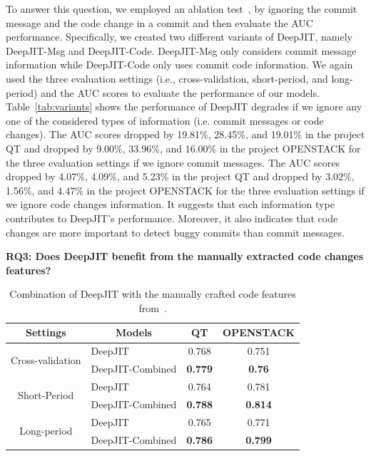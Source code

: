 
To answer this question, we employed an ablation test~\cite{korbar2017deep, liu2017deep}, by ignoring the commit message and the code change in a commit and then evaluate the AUC performance. Specifically, we created two different variants of DeepJIT, namely DeepJIT-Msg and DeepJIT-Code. DeepJIT-Msg only considers commit message information while DeepJIT-Code only uses commit code information. We again used the three evaluation settings (i.e., cross-validation, short-period, and long-period) and the AUC scores to evaluate the performance of our models. Table~\ref{tab:variants} shows the performance of DeepJIT degrades if we ignore any one of the considered types of information (i.e. commit messages or code changes). The AUC scores dropped by 19.81\%, 28.45\%, and 19.01\% in the project QT and dropped by 9.00\%, 33.96\%, and 16.00\% in the project OPENSTACK for the three evaluation settings if we ignore commit messages. The AUC scores dropped by 4.07\%, 4.09\%, and 5.23\% in the project QT and dropped by 3.02\%, 1.56\%, and 4.47\% in the project OPENSTACK for the three evaluation settings if we ignore code changes information. It suggests that each information type contributes to DeepJIT's performance. Moreover, it also indicates that code changes are more important to detect buggy commits than commit messages. 

\hspace{0.5cm}

\noindent \textbf{RQ3: Does DeepJIT benefit from the manually extracted code changes features?}

\begin{table}[ht]
  \centering
  \caption{Combination of DeepJIT with the manually crafted code features from~\cite{mcintosh2018fix}.}
    \begin{tabular}{|c|l|c|c|}
    \hline
    \textbf{Settings} & \multicolumn{1}{c|}{\textbf{Models}} & QT & OPENSTACK \\
    \hline
    \hline
    \multirow{2}[4]{*}{Cross-validation} & DeepJIT & 0.768 & 0.751 \\
\cline{2-4}          & DeepJIT-Combined & \textbf{0.779} & \textbf{0.76} \\
    \hline
    \multirow{2}[4]{*}{Short-Period} & DeepJIT & 0.764 & 0.781 \\
\cline{2-4}          & DeepJIT-Combined & \textbf{0.788} & \textbf{0.814} \\
    \hline
    \multirow{2}[4]{*}{Long-period} & DeepJIT & 0.765 & 0.771 \\
\cline{2-4}          & DeepJIT-Combined & \textbf{0.786} & \textbf{0.799} \\
    \hline
    \end{tabular}%
  \label{tab:combined}%
\end{table}%

